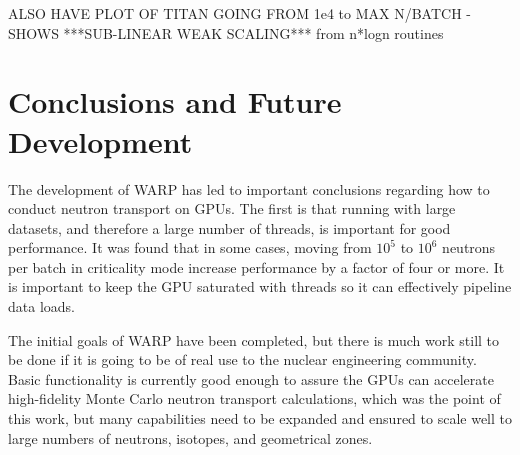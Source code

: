 \documentclass[preprint,12pt]{elsarticle}
\begin{document}
ALSO HAVE PLOT OF TITAN GOING FROM 1e4 to MAX N/BATCH - SHOWS ***SUB-LINEAR WEAK SCALING*** from n*logn routines

\section{Conclusions and Future Development}
\label{sec:conc}



The development of WARP has led to important conclusions regarding how to conduct neutron transport on GPUs.  The first is that running with large datasets, and therefore a large number of threads, is important for good performance.  It was found that in some cases, moving from $10^5$ to $10^6$ neutrons per batch in criticality mode increase performance by a factor of four or more.  It is important to keep the GPU saturated with threads so it can effectively pipeline data loads.  

The initial goals of WARP have been completed, but there is much work still to be done if it is going to be of real use to the nuclear engineering community.  Basic functionality is currently good enough to assure the GPUs can accelerate high-fidelity Monte Carlo neutron transport calculations, which was the point of this work, but many capabilities need to be expanded and ensured to scale well to large numbers of neutrons, isotopes, and geometrical zones.
\end{document}
